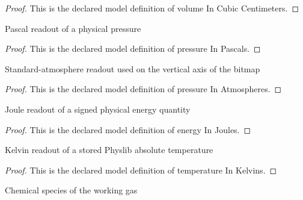\begin{proof}
  This is the declared model definition of volume In Cubic Centimeters.
\end{proof}
\begin{definition}
  \label{def:physics:phyx-mini-0409:phyxminiproblems-problemphyxmini0409-pressureinpascals}
  Pascal readout of a physical pressure
\end{definition}
\begin{proof}
  This is the declared model definition of pressure In Pascals.
\end{proof}
\begin{definition}
  \label{def:physics:phyx-mini-0409:phyxminiproblems-problemphyxmini0409-pressureinatmospheres}
  Standard-atmosphere readout used on the vertical axis of the bitmap
\end{definition}
\begin{proof}
  This is the declared model definition of pressure In Atmospheres.
\end{proof}
\begin{definition}
  \label{def:physics:phyx-mini-0409:phyxminiproblems-problemphyxmini0409-energyinjoules}
  Joule readout of a signed physical energy quantity
\end{definition}
\begin{proof}
  This is the declared model definition of energy In Joules.
\end{proof}
\begin{definition}
  \label{def:physics:phyx-mini-0409:phyxminiproblems-problemphyxmini0409-temperatureinkelvins}
  Kelvin readout of a stored Physlib absolute temperature
\end{definition}
\begin{proof}
  This is the declared model definition of temperature In Kelvins.
\end{proof}
\begin{definition}
  \label{def:physics:phyx-mini-0409:phyxminiproblems-problemphyxmini0409-gasspecies}
  Chemical species of the working gas
\end{definition}
